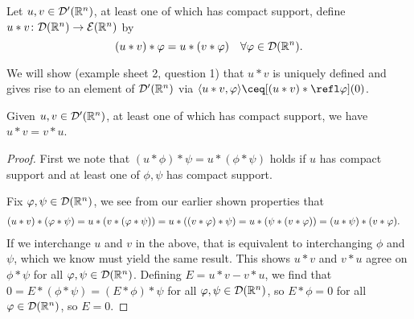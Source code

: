 \begin{definition}
	Let $u, v \in \mathcal D'(\mathbb R^n)$, at least one of which has compact support, define $u * v \colon \mathcal D(\mathbb R^n) \to \mathcal E(\mathbb R^n)$ by
	\[
	(u * v) * \varphi = u * (v * \varphi) \quad \forall \varphi \in \mathcal D(\mathbb R^n). 
	\]
\end{definition}
We will show (example sheet 2, question 1) that $u * v$ is uniquely defined and gives rise to an element of $\mathcal D'(\mathbb R^n)$ via $\ang{u * v, \phi} \ceq [(u * v) * \refl\phi](0)$. 

\begin{lemma}
	Given $u, v \in \mathcal D'(\mathbb R^n)$, at least one of which has compact support, we have $u * v = v * u$. 
\end{lemma}

\begin{proof}
	First we note that $(u * \phi) * \psi = u * (\phi * \psi)$ holds if $u$ has compact support and at least one of $\phi, \psi$ has compact support. 
	
	Fix $\varphi, \psi \in \mathcal D(\mathbb R^n)$, we see from our earlier shown properties that 
	\begin{align*}
	(u * v) * (\varphi * \psi) &= u * \qty(v * (\varphi * \psi)) = u * ((v * \varphi) * \psi) = u * (\psi * (v * \varphi)) = (u * \psi) * (v * \varphi).
	\end{align*}
	If we interchange $u$ and $v$ in the above, that is equivalent to interchanging $\phi$ and $\psi$, which we know must yield the same result. This shows $u * v$ and $v * u$ agree on $\phi * \psi$ for all $\varphi, \psi \in \mathcal D(\mathbb R^n)$. Defining $E = u * v - v * u$, we find that $0 = E * (\phi * \psi) = (E * \phi) * \psi$ for all $\varphi, \psi \in \mathcal D(\mathbb R^n)$, so $E * \phi = 0$ for all $\varphi \in \mathcal D(\mathbb R^n)$, so $E = 0$. 
\end{proof}
